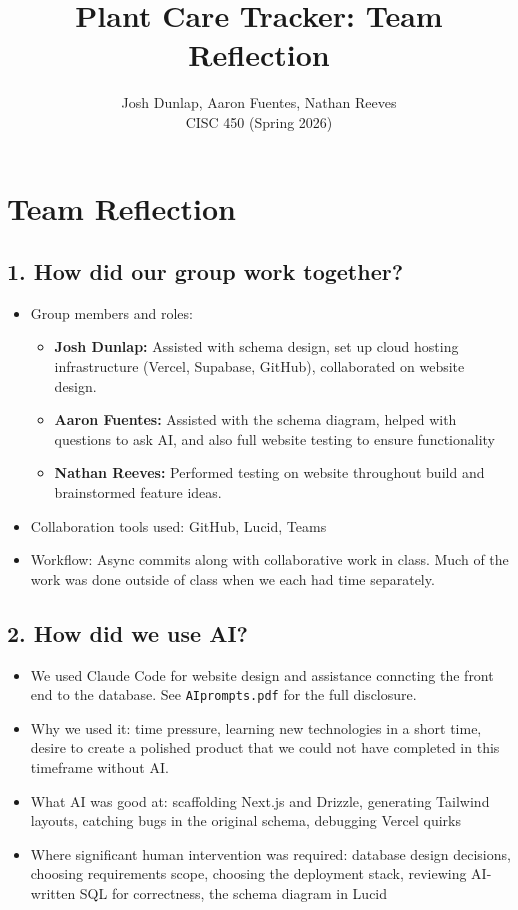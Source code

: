 \documentclass[11pt]{article}
\title{Plant Care Tracker: Team Reflection}
\author{Josh Dunlap, Aaron Fuentes, Nathan Reeves \\ CISC 450 (Spring 2026)}
\date{}
\begin{document}
\maketitle
\section*{Team Reflection}
\subsection*{1. How did our group work together?}
\begin{itemize}[leftmargin=*]
  \item Group members and roles:
  \begin{itemize}
    \item \textbf{Josh Dunlap:} Assisted with schema design, set up cloud hosting infrastructure (Vercel, Supabase, GitHub), collaborated on website design. 
    \item \textbf{Aaron Fuentes:} Assisted with the schema diagram, helped with questions to ask AI, and also full website testing to ensure functionality
    \item \textbf{Nathan Reeves:} Performed testing on website throughout build and brainstormed feature ideas.
  \end{itemize}
  \item Collaboration tools used: GitHub, Lucid, Teams
  \item Workflow: Async commits along with collaborative work in class. Much of the work was done outside of class when we each had time separately.
\end{itemize}
\subsection*{2. How did we use AI?}
\begin{itemize}[leftmargin=*]
  \item We used Claude Code for website design and assistance conncting the front end to the database. See \texttt{AIprompts.pdf} for the full
    disclosure.
  \item Why we used it: time pressure, learning new technologies in a short time, desire to create a polished product that we could not have completed in this timeframe without AI.
  \item What AI was good at: scaffolding Next.js and Drizzle,  generating Tailwind layouts, catching bugs in the original schema, debugging Vercel quirks
  \item Where significant human intervention was required: database design decisions, choosing requirements scope, choosing the deployment stack, reviewing AI-written SQL for correctness, the schema  diagram in Lucid
\end{itemize}
\end{document}
